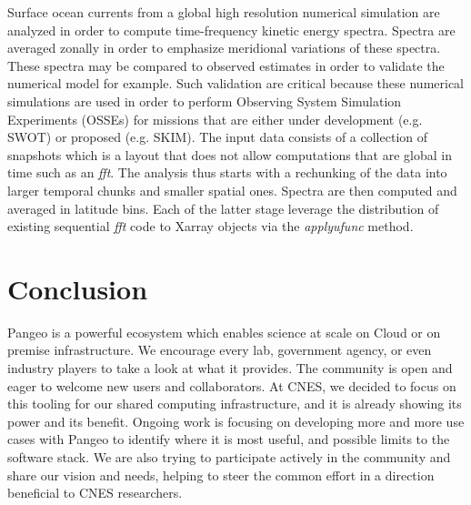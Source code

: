 \documentclass{article}
\begin{document}
Surface ocean currents from a global high resolution numerical simulation are analyzed in order to compute time-frequency kinetic energy spectra.
Spectra are averaged zonally in order to emphasize meridional variations of these spectra.
These spectra may be compared to observed estimates in order to validate the numerical model for example.
Such validation are critical because these numerical simulations are used in order to perform Observing System Simulation Experiments (OSSEs) for missions that are either under development (e.g. SWOT) or proposed (e.g. SKIM).
The input data consists of a collection of snapshots which is a layout that does not allow computations that are global in time such as an \textit{fft}.
The analysis thus starts with a rechunking of the data into larger temporal chunks and smaller spatial ones.
Spectra are then computed and averaged in latitude bins.
Each of the latter stage leverage the distribution of existing sequential \textit{fft} code to Xarray objects via the \textit{apply\textunderscore ufunc} method.


\section{Conclusion}
\label{sec:conclusion}

Pangeo is a powerful ecosystem which enables science at scale on Cloud or on premise infrastructure. We encourage every lab, government agency, or even industry players to take a look at what it provides. The community is open and eager to welcome new users and collaborators.
At CNES, we decided to focus on this tooling for our shared computing infrastructure, and it is already showing its power and its benefit. Ongoing work is focusing on developing more and more use cases with Pangeo to identify where it is most useful, and possible limits to the software stack. We are also trying to participate actively in the community and share our vision and needs, helping to steer the common effort in a direction beneficial to CNES researchers.






\end{document}
